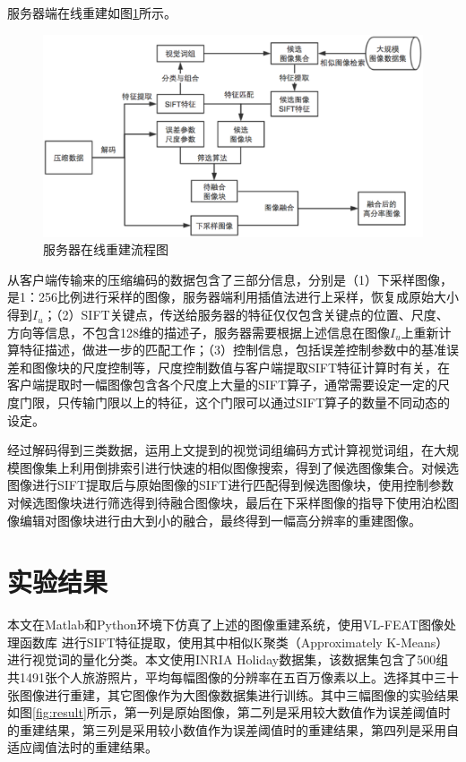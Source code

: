 \documentclass[UTF8]{csoarticle}
\begin{document}
服务器端在线重建如图\ref{fig:serverOnline}所示。
\begin{figure}
\centering\includegraphics[width=15cm]{serverOnline}
\caption{服务器在线重建流程图}
\label{fig:serverOnline}
\end{figure}
从客户端传输来的压缩编码的数据包含了三部分信息，分别是（1）下采样图像，是1：256比例进行采样的图像，服务器端利用插值法进行上采样，恢复成原始大小得到\(I_u\)；（2）SIFT关键点，传送给服务器的特征仅仅包含关键点的位置、尺度、方向等信息，不包含128维的描述子，服务器需要根据上述信息在图像\(I_u\)上重新计算特征描述，做进一步的匹配工作；（3）控制信息，包括误差控制参数中的基准误差和图像块的尺度控制等，尺度控制数值与客户端提取SIFT特征计算时有关，在客户端提取时一幅图像包含各个尺度上大量的SIFT算子，通常需要设定一定的尺度门限，只传输门限以上的特征，这个门限可以通过SIFT算子的数量不同动态的设定。

经过解码得到三类数据，运用上文提到的视觉词组编码方式计算视觉词组，在大规模图像集上利用倒排索引进行快速的相似图像搜索，得到了候选图像集合。对候选图像进行SIFT提取后与原始图像的SIFT进行匹配得到候选图像块，使用控制参数对候选图像块进行筛选得到待融合图像块，最后在下采样图像的指导下使用泊松图像编辑对图像块进行由大到小的融合，最终得到一幅高分辨率的重建图像。

\section{实验结果}
本文在Matlab和Python环境下仿真了上述的图像重建系统，使用VL-FEAT图像处理函数库
\cite{vl_feat}进行SIFT特征提取，使用其中相似K聚类（Approximately K-Means）进行视觉词的量化分类。本文使用INRIA Holiday数据集\cite{INRIA}，该数据集包含了500组共1491张个人旅游照片，平均每幅图像的分辨率在五百万像素以上。选择其中三十张图像进行重建，其它图像作为大图像数据集进行训练。其中三幅图像的实验结果如图\ref{fig:result}所示，第一列是原始图像，第二列是采用较大数值作为误差阈值时的重建结果，第三列是采用较小数值作为误差阈值时的重建结果，第四列是采用自适应阈值法时的重建结果。
\end{document}
